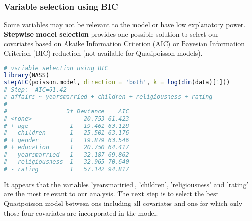\documentclass[border=5mm, convert, usenames, dvipsnames,beamer]{standalone}
\begin{document}
\begin{frame}[ fragile]{}
\frametitle{Variable selection using BIC}

\footnotesize
\vspace{15mm}
\noindent
Some variables may not be relevant to the model or have low explanatory power. \textbf{Stepwise model selection} provides one possible solution to select our covariates based on Akaike Information Criterion (AIC) or {\color{purple}Bayesian Information Criterion (BIC)} reduction (not available for Quasipoisson models).

\par


\tiny
\begin{lstlisting}[language=R]
# variable selection using BIC
library(MASS)
stepAIC(poisson.model, direction = 'both', k = log(dim(data)[1]))
# Step:  AIC=61.42
# affairs ~ yearsmarried + children + religiousness + rating
# 
#                 Df Deviance    AIC
# <none>               20.753 61.423
# + age            1   19.461 63.128
# - children       1   25.501 63.176
# + gender         1   19.879 63.546
# + education      1   20.750 64.417
# - yearsmarried   1   32.187 69.862
# - religiousness  1   32.965 70.640
# - rating         1   57.142 94.817
\end{lstlisting}
\par


\footnotesize
\noindent
It appears that the variables  'yearsmariried', 'children', 'religiousness' and 'rating' are the most relevant to our analysis. The next step is to select the best Quasipoisson model between one including all covariates and one for which only those four covariates are incorporated in the model.
\par

\end{frame}
\end{document}
